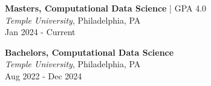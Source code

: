 


\noindent
\begin{minipage}[t]{0.48\textwidth}
    \textbf{Masters, Computational Data Science} | GPA 4.0\\
    \textit{Temple University}, Philadelphia, PA\\
    Jan 2024 - Current
\end{minipage}%
\hfill
\begin{minipage}[t]{0.48\textwidth}
    \textbf{Bachelors, Computational Data Science}\\
    \textit{Temple University}, Philadelphia, PA\\
    Aug 2022 - Dec 2024
\end{minipage}




